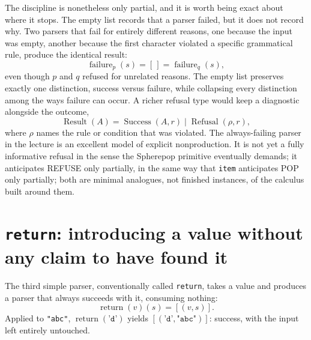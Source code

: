 \documentclass[11pt]{article}
\begin{document}
The discipline is nonetheless only partial, and it is worth being exact about where it stops. The empty list records that a parser failed, but it does not record why. Two parsers that fail for entirely different reasons, one because the input was empty, another because the first character violated a specific grammatical rule, produce the identical result:
\[
\operatorname{failure}_{p}(s) = [\,] = \operatorname{failure}_{q}(s),
\]
even though $p$ and $q$ refused for unrelated reasons. The empty list preserves exactly one distinction, success versus failure, while collapsing every distinction among the ways failure can occur. A richer refusal type would keep a diagnostic alongside the outcome,
\[
\operatorname{Result}(A) = \operatorname{Success}(A, r) \mid \operatorname{Refusal}(\rho, r),
\]
where $\rho$ names the rule or condition that was violated. The always-failing parser in the lecture is an excellent model of explicit nonproduction. It is not yet a fully informative refusal in the sense the Spherepop primitive eventually demands; it anticipates REFUSE only partially, in the same way that \texttt{item} anticipates POP only partially; both are minimal analogues, not finished instances, of the calculus built around them.

\section{\texttt{return}: introducing a value without any claim to have found it}

The third simple parser, conventionally called \texttt{return}, takes a value and produces a parser that always succeeds with it, consuming nothing:
\[
\operatorname{return}(v)(s) = [(v, s)].
\]
Applied to \texttt{"abc"}, $\operatorname{return}(\texttt{'d'})$ yields $[(\texttt{'d'}, \texttt{"abc"})]$: success, with the input left entirely untouched.
\end{document}
